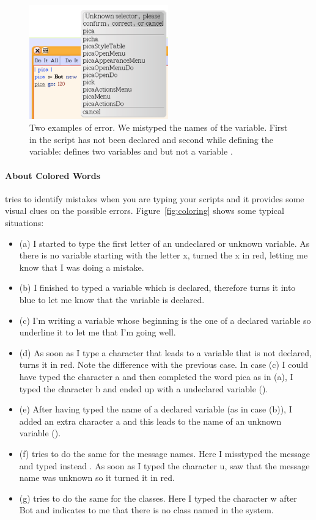 \begin{figure}[h!]
\begin{center}\includegraphics[width=6cm]{periodMissing}
\caption{Two examples of error. We mistyped the names of the variable. First in the script  has not been declared and second while defining the variable:  defines two variables  and  but not a variable . \label{fig:periodMissing}}\end{center}
\end{figure} 

\paragraph{About Colored Words}
\sq tries to identify mistakes when you are typing your scripts and it provides some visual clues on the possible errors. Figure~\ref{fig:coloring} shows some typical situations: 
\begin{itemize}
\item{(a)} I started to type the first letter of an undeclared or unknown variable. As there is no variable starting with the letter x, \sq turned the x in red, letting me know that I was doing a mistake. 
\item{(b)} I finished to typed a variable which is declared, therefore \sq turns it into blue to let me know that the variable is declared. 
\item{(c)} I'm writing a variable whose beginning is the one of a declared variable so \sq underline it to let me that I'm going well. 
\item{(d)} As soon as I type a character that leads to a variable that is not declared, \sq turns it in red. Note the difference with the previous case. In case (c) I could have typed the character a and then completed the word pica as in (a), I typed the character b and ended up with a undeclared variable (). 
\item{(e)} After having typed the name of a declared variable (as in case (b)), I added an extra character a and this leads to the name of an unknown variable ().
\item{(f)} \sq tries to do the same for the message names. Here I misstyped the message  and typed instead . As soon as I typed the character u, \sq saw that the message name  was unknown so it turned it in red. 
\item{(g)} \sq tries to  do the same for the classes. Here I typed the character w after Bot and \sq indicates to me that there is no class named  in the system.
\end{itemize}



